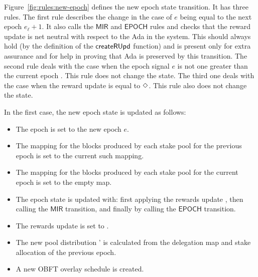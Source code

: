 Figure~\ref{fig:rules:new-epoch} defines the new epoch state transition. It has three rules.
The first rule describes the change in the case of $e$ being equal to the next epoch $e_\ell+ 1$.
It also calls the $\mathsf{MIR}$ and $\mathsf{EPOCH}$ rules and checks that the reward update
is net neutral with respect to the Ada in the system.
This should always hold (by the definition of the $\mathsf{createRUpd}$ function)
and is present only for extra assurance and for help in proving
that Ada is preserved by this transition.
The second rule deals with the case when the epoch signal $e$ is not one greater than the
current epoch . This rule does not change the state.
The third one deals with the case when the reward update is equal to $\Diamond$.
This rule also does not change the state.

In the first case, the new epoch state is updated as follows:

\begin{itemize}
\item The epoch is set to the new epoch $e$.
\item The mapping for the blocks produced by each stake pool for the previous epoch
  is set to the current such mapping.
\item The mapping for the blocks produced by each stake pool for the current epoch
  is set to the empty map.
\item The epoch state is updated with: first applying the rewards update ,
  then calling the $\mathsf{MIR}$ transition, and finally by calling the
  $\mathsf{EPOCH}$ transition.
\item The rewards update is set to \Nothing.
\item The new pool distribution ' is calculated from the delegation map and
  stake allocation of the previous epoch.
\item A new OBFT overlay schedule is created.
\end{itemize}

